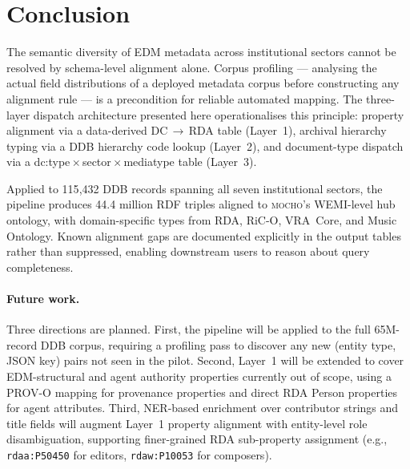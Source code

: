 
\section{Conclusion}
\label{sec:conclusion}

The semantic diversity of EDM metadata across institutional sectors cannot be
resolved by schema-level alignment alone.
Corpus profiling --- analysing the actual field distributions of a deployed
metadata corpus before constructing any alignment rule --- is a precondition
for reliable automated mapping.
The three-layer dispatch architecture presented here operationalises this
principle: property alignment via a data-derived DC\,$\to$\,RDA table
(Layer~1), archival hierarchy typing via a DDB hierarchy code lookup
(Layer~2), and document-type dispatch via a dc:type\,$\times$\,sector\,$\times$\,mediatype
table (Layer~3).

Applied to 115{,}432 DDB records spanning all seven institutional sectors,
the pipeline produces 44.4 million RDF triples aligned to \textsc{mocho}'s
WEMI-level hub ontology, with domain-specific types from RDA, RiC-O, VRA~Core,
and Music Ontology.
Known alignment gaps are documented explicitly in the output tables rather
than suppressed, enabling downstream users to reason about query completeness.

\paragraph{Future work.}
Three directions are planned.
First, the pipeline will be applied to the full 65M-record DDB corpus,
requiring a profiling pass to discover any new (entity type, JSON key) pairs
not seen in the pilot.
Second, Layer~1 will be extended to cover EDM-structural and agent authority
properties currently out of scope, using a PROV-O mapping for provenance
properties and direct RDA Person properties for agent attributes.
Third, NER-based enrichment over contributor strings and title fields will
augment Layer~1 property alignment with entity-level role disambiguation,
supporting finer-grained RDA sub-property assignment
(e.g., \texttt{rdaa:P50450} for editors, \texttt{rdaw:P10053} for composers).
